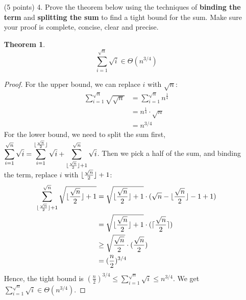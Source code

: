 \documentclass[paper=a4, fontsize=11pt]{scrartcl}
\DeclarePairedDelimiter\floor{\lfloor}{\rfloor}
\DeclarePairedDelimiter\ceil{\lceil}{\rceil}
\newtheorem{theorem}{Theorem}
\numberwithin{equation}{section}		%
\numberwithin{figure}{section}			%
\numberwithin{table}{section}				%
\begin{document}
\begin{enumerate}
\begin{proof}
	\begin{align*}
		\sum_{\floor{\frac{n}{2}} + 1}^{n}(\floor{\frac{n}{2}} + 1)^d &= (\floor{\frac{n}{2}} + 1)^d\cdot (n - \floor{\frac{n}{2}} - 1 + 1) \\
		&= (\floor{\frac{n}{2}} + 1)^d(\ceil{\frac{n}{2}}) \\
		&\geq (\frac{n}{2})^d(\frac{n}{2}) \\
		&= (\frac{n}{2})^{d+1}
	\end{align*}
	Hence, the tight bound is $(\frac{n}{2})^{d+1} \leq \sum_{i=1}^{n}i^d \leq n^{d+1}$. We get $\sum_{i=1}^{n}i^d \in \Theta\left(n^{d+1}\right)$.
\end{proof}


\item [(5 points) 4.] Prove the theorem below using the techniques of \textbf{binding the term} and \textbf{splitting the sum} to find a tight bound for the sum.  Make sure your proof is complete, concise, clear and precise.

\begin{theorem}
\[
\sum_{i=1}^{\sqrt{n}}\sqrt{i} \in \Theta\left(n^{3/4}\right)
\]
\end{theorem}
\begin{proof}
	For the upper bound, we can replace $i$ with $\sqrt{n}$:
	\begin{align*}
		\sum_{i=1}^{\sqrt{n}}\sqrt{\sqrt{n}} &= \sum_{i=1}^{\sqrt{n}} n^{\frac{1}{4}} \\
		&= n^{\frac{1}{4}} \cdot \sqrt{n} \\
		&= n^{3/4}
	\end{align*}
	For the lower bound, we need to split the sum first, $\displaystyle\sum_{i=1}^{\sqrt{n}}\sqrt{i} = \sum_{i=1}^{\floor{\frac{\sqrt{n}}{2}}}\sqrt{i} + \sum_{\floor{\frac{\sqrt{n}}{2}} + 1}^{\sqrt{n}}\sqrt{i}$. Then we pick a half of the sum, and binding the term, replace $i$ with $\floor{\frac{\sqrt{n}}{2}} + 1$:
	\begin{align*}
		\sum_{\floor{\frac{\sqrt{n}}{2}} + 1}^{\sqrt{n}}\sqrt{\floor{\frac{\sqrt{n}}{2}} + 1} &= \sqrt{\floor{\frac{\sqrt{n}}{2}} + 1} \cdot (\sqrt{n} - \floor{\frac{\sqrt{n}}{2}} - 1 + 1) \\
		&= \sqrt{\floor{\frac{\sqrt{n}}{2}} + 1} \cdot (\ceil{\frac{\sqrt{n}}{2}}) \\
		&\geq \sqrt{\frac{\sqrt{n}}{2}} \cdot (\frac{\sqrt{n}}{2}) \\
		&= (\frac{n}{2})^{3/4}
	\end{align*}
	Hence, the tight bound is $(\frac{n}{2})^{3/4} \leq \sum_{i=1}^{\sqrt{n}}\sqrt{i} \leq n^{3/4}$. We get $\sum_{i=1}^{\sqrt{n}}\sqrt{i} \in \Theta\left(n^{3/4}\right)$.
\end{proof}


\end{enumerate}
\end{document}
